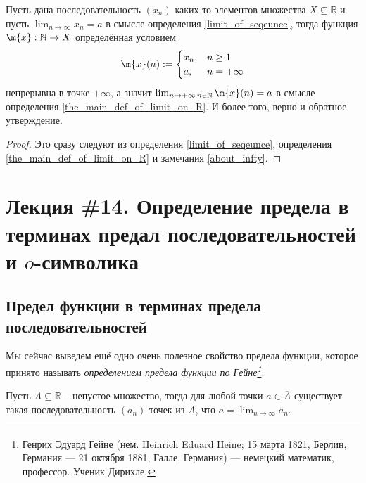 \begin{theorem}\label{lim_of_seqence=contionous}
 Пусть дана последовательность $(x_n)$ каких-то элементов множества $X \subseteq \mathbb{R}$ и пусть $\lim_{n\to \infty}x_n =a$ в смысле определения \ref{limit_of_seqeunce}, тогда функция $\m{x}: \mathbb{N} \to X$ определённая условием
    \[
     \m{x}(n): =\begin{cases}
         x_n, & n \ge 1\\
         a, & n = +\infty
     \end{cases}
    \]
    непрерывна в точке $+\infty$, а значит $\lim_{n \to +\infty\, n \in \mathbb{N}}\m{x}(n) = a$ в смысле определения \ref{the_main_def_of_limit_on_R}. И более того, верно и обратное утверждение.
\end{theorem}
\begin{proof}
    Это сразу следуют из определения \ref{limit_of_seqeunce}, определения \ref{the_main_def_of_limit_on_R} и замечания \ref{about_infty}.
\end{proof}





\section{Лекция \#14. Определение предела в терминах предал последовательностей и $o$-символика}

\subsection{Предел функции в терминах предела последовательностей}

Мы сейчас выведем ещё одно очень полезное свойство предела функции, которое принято называть \textit{определением предела функции по Гейне\footnote{Генрих Эдуард Гейне (нем. Heinrich Eduard Heine; 15 марта 1821, Берлин, Германия — 21 октября 1881, Галле, Германия) — немецкий математик, профессор. Ученик Дирихле.}}.

\begin{lemma}\label{choice_of_seqeunce_on_R}
Пусть $A\subseteq \mathbb{R}$ -- непустое множество, тогда для любой точки $a \in \overline{A}$ существует такая последовательность $(a_n)$ точек из $A$, что $a = \lim_{n \to \infty} a_n$.
\end{lemma}

